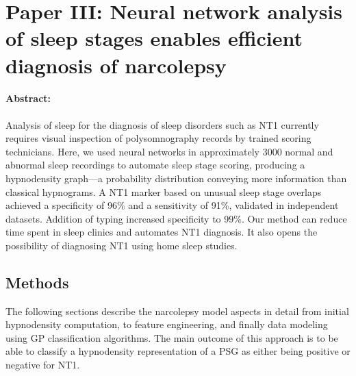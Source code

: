 \section[Paper III: Neural network analysis of sleep stages enables efficient diagnosis of narcolepsy]{Paper III: Neural network analysis of sleep stages enables efficient diagnosis of narcolepsy%
    }\label{sec:paperiii-narcolepsy}

\begin{tcolorbox}[colframe=white]
\paragraph{Abstract:} Analysis of sleep for the diagnosis of sleep disorders such as \ac{NT1} currently requires visual inspection of polysomnography records by trained scoring technicians. 
Here, we used neural networks in approximately \num{3000} normal and abnormal sleep recordings to automate sleep stage scoring, producing a hypnodensity graph---a probability distribution conveying more information than classical hypnograms. 
A \ac{NT1} marker based on unusual sleep stage overlaps achieved a specificity of 96\% and a sensitivity of 91\%, validated in independent datasets. 
Addition of \hla typing increased specificity to 99\%. 
Our method can reduce time spent in sleep clinics and automates \ac{NT1} diagnosis. 
It also opens the possibility of diagnosing \ac{NT1} using home sleep studies.
\end{tcolorbox}

\subsection{Methods}

The following sections describe the narcolepsy model aspects in detail from initial hypnodensity computation, to feature engineering, and finally data modeling using \ac{GP} classification algorithms.
The main outcome of this approach is to be able to classify a hypnodensity representation of a \ac{PSG} as either being positive or negative for \ac{NT1}.

